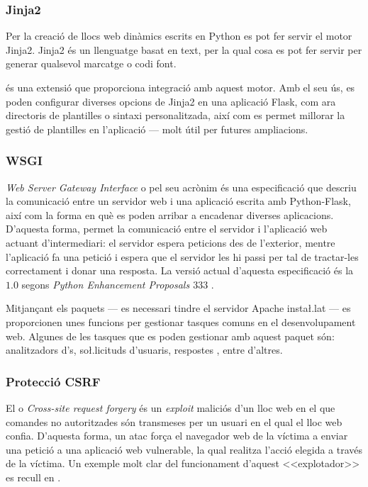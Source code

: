 \documentclass{tfgitic}[2022/06/30]
\begin{document}
\subsubsection{Jinja2}
Per la creació de llocs web dinàmics escrits en Python es pot fer servir el motor Jinja2. Jinja2 és un llenguatge basat en text, per la qual cosa es pot fer servir per generar qualsevol marcatge o codi font.

 és una extensió que proporciona integració amb aquest motor. Amb el seu ús, es poden configurar diverses opcions de Jinja2 en una aplicació Flask, com ara directoris de plantilles o sintaxi personalitzada, així com es permet millorar la gestió de plantilles en l'aplicació --- molt útil per futures ampliacions.

\subsubsection{WSGI}
\label{subsubsection:wsgi}
\emph{Web Server Gateway Interface} o  pel seu acrònim és una especificació que descriu la comunicació entre un servidor web i una aplicació escrita amb Python-Flask, així com la forma en què es poden arribar a encadenar diverses aplicacions. D'aquesta forma,  permet la comunicació entre el servidor i l'aplicació web actuant d'intermediari: el servidor espera peticions des de l'exterior, mentre l'aplicació fa una petició i espera que el servidor les hi passi per tal de tractar-les correctament i donar una resposta. La versió actual d'aquesta especificació és la $1.0$ segons \emph{Python Enhancement Proposals $333$} \cite{python:pepWsgi}.

Mitjançant els paquets   --- es necessari tindre el servidor Apache insta\l.lat --- es proporcionen unes funcions per gestionar tasques comuns en el desenvolupament web. Algunes de les tasques que es poden gestionar amb aquest paquet són: analitzadors d's, so\l.licituds d'usuaris, respostes , entre d'altres.

\subsubsection{Protecció CSRF}
El  o \emph{Cross-site request forgery} és un \emph{exploit} maliciós d'un lloc web en el que comandes no autoritzades són transmeses per un usuari en el qual el lloc web confia. D'aquesta forma, un atac  força el navegador web de la víctima a enviar una petició a una aplicació web vulnerable, la qual realitza l'acció elegida a través de la víctima. Un exemple molt clar del funcionament d'aquest <<explotador>> es recull en \cite{microsoft:csrf}.
\end{document}
